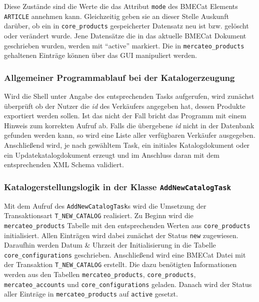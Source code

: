 	Diese Zustände sind die Werte die das Attribut \texttt{mode} des BMECat Elements \texttt{ARTICLE} annehmen kann. Gleichzeitig geben sie an dieser Stelle Auskunft darüber, ob ein in \texttt{core\_products} gespeicherter Datensatz neu ist bzw. gelöscht oder verändert wurde. Jene Datensätze die in das aktuelle BMECat Dokument geschrieben wurden, werden mit \enquote{active} markiert. Die in \texttt{mercateo\_products} gehaltenen Einträge können über das GUI manipuliert werden.
	
	\subsubsection{Allgemeiner Programmablauf bei der Katalogerzeugung}
	
	Wird die Shell unter Angabe des entsprechenden Tasks aufgerufen, wird zunächst überprüft ob der Nutzer die \textit{id} des Verkäufers angegeben hat, dessen Produkte exportiert werden sollen. Ist das nicht der Fall bricht das Programm mit einem Hinweis zum korrekten Aufruf ab. Falls die übergebene \textit{id} nicht in der Datenbank gefunden werden kann, so wird eine Liste aller verfügbaren Verkäufer ausgegeben. Anschließend wird, je nach gewähltem Task, ein initiales Katalogdokument oder ein Updatekatalogdokument erzeugt und im Anschluss daran mit dem entsprechenden XML Schema validiert. 
	
	\subsubsection{Katalogerstellungslogik in der Klasse \texttt{AddNewCatalogTask}}
	
	Mit dem Aufruf des \texttt{AddNewCatalogTask}s wird die Umsetzung der Transaktionsart \texttt{T\_NEW\_CATALOG} realisiert. Zu Beginn wird die \texttt{mercateo\_products} Tabelle mit den entsprechenden Werten aus \texttt{core\_products} initialisiert. Allen Einträgen wird dabei zunächst der Status \texttt{new} zugewiesen. Daraufhin werden Datum \& Uhrzeit der Initialisierung in die Tabelle \texttt{core\_configurations} geschrieben. Anschließend wird eine BMECat Datei mit der Transaktion \texttt{T\_NEW\_CATALOG} erstellt. Die dazu benötigten Informationen werden aus den Tabellen \texttt{mercateo\_products}, \texttt{core\_products}, \texttt{mercateo\_accounts} und \texttt{core\_configurations} geladen. Danach wird der Status aller Einträge in \texttt{mercateo\_products} auf \texttt{active} gesetzt. 
	
